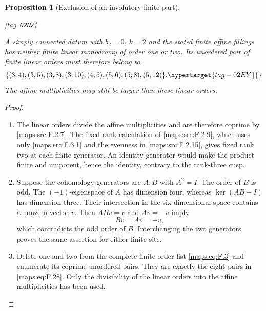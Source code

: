 \documentclass[11pt,a4paper]{article}
\numberwithin{equation}{section}
\newtheorem{proposition}[proposition]{Proposition}
\theoremstyle{definition}
\newcommand{\StatementRecord}[4]{{\upshape\footnotesize[tag~\texttt{#3}]}\enspace\ignorespaces}
\begin{document}
\begin{proposition}[Exclusion of an involutory finite part]\hypertarget{tag-02NZ}{}\label{maps:src:F.2.8}
\StatementRecord{maps:src:F.2.8}{proved}{02NZ}{\cref{maps:src:F.2.7}, \cref{maps:src:F.2.15}, \cref{maps:src:F.3.1}, \eqref{maps:eq:F.3}, \cref{maps:src:F.2.9}}


A simply connected datum with $b_2=0$, $k=2$ and the stated
finite affine fillings has neither finite linear
monodromy of order one or two.  Its unordered pair of finite
linear orders must therefore belong to
\begin{equation}
 \{(3,4),(3,5),(3,8),(3,10),(4,5),
       (5,6),(5,8),(5,12)\}.
 \hypertarget{tag-02EY}{}\label{maps:eq:F.28}
\end{equation}
The affine multiplicities may still be larger than these
linear orders.

\end{proposition}


\begin{proof}
\begin{enumerate}[label=\arabic*.]
\item The linear orders divide the affine multiplicities and are
therefore coprime by \ref{maps:src:F.2.7}.  The fixed-rank calculation
of \ref{maps:src:F.2.9}, which uses only \ref{maps:src:F.3.1} and the
evenness in \ref{maps:src:F.2.15}, gives fixed rank two at each finite
generator.  An identity generator would make the product finite and
unipotent, hence the identity, contrary to the rank-three cusp.

\item Suppose the cohomology generators are $A,B$ with $A^2=I$.
The order of $B$ is odd.  The $(-1)$-eigenspace of $A$ has dimension
four, whereas $\ker(AB-I)$ has dimension three.  Their intersection
in the six-dimensional space contains a nonzero vector $v$.
Then $ABv=v$ and $Av=-v$ imply
\[
 Bv=Av=-v,
\]
which contradicts the odd order of $B$.  Interchanging the two
generators proves the same assertion for either finite site.

\item Delete one and two from the complete finite-order list
\eqref{maps:eq:F.3} and enumerate its coprime unordered pairs.
They are exactly the eight pairs in \eqref{maps:eq:F.28}.
Only the divisibility of the linear orders into the affine
multiplicities has been used.
\end{enumerate}
\end{proof}
\end{document}
